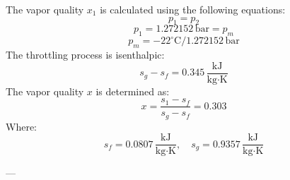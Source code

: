 The vapor quality \( x_1 \) is calculated using the following equations:  
\[
p_1 = p_2
\]
\[
p_1 = 1.272152 \, \text{bar} = p_m
\]
\[
p_m = -22^\circ\text{C} / 1.272152 \, \text{bar}
\]  
The throttling process is isenthalpic:  
\[
s_g - s_f = 0.345 \, \frac{\text{kJ}}{\text{kg·K}}
\]  
The vapor quality \( x \) is determined as:  
\[
x = \frac{s_1 - s_f}{s_g - s_f} = 0.303
\]  
Where:  
\[
s_f = 0.0807 \, \frac{\text{kJ}}{\text{kg·K}}, \quad s_g = 0.9357 \, \frac{\text{kJ}}{\text{kg·K}}
\]

---